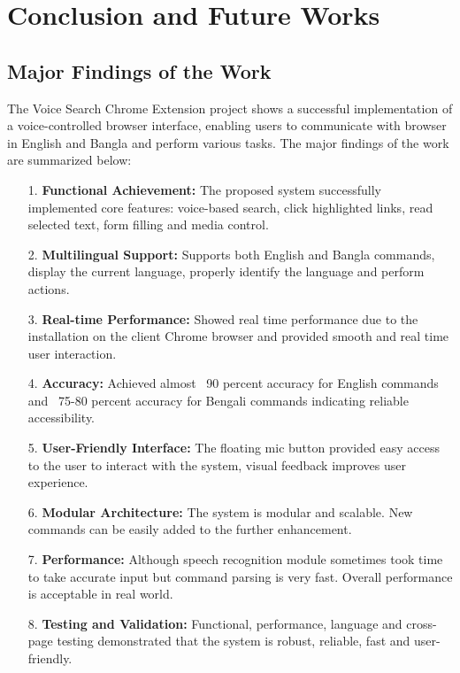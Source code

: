 
\chapter{Conclusion and Future Works}

\section{Major Findings of the Work}
The Voice Search Chrome Extension project shows a successful implementation of a voice-controlled browser interface, enabling users to communicate with browser in English and Bangla and perform various tasks. The major findings of the work are summarized below:
\begin{itemize}
\item[1.] 	\textbf{Functional Achievement:} The proposed system successfully implemented core features: voice-based search, click highlighted links, read selected text, form filling and media control.
\item[2.]	\textbf{Multilingual Support:} Supports both English and Bangla commands, display the current language, properly identify the language and perform actions.
\item[3.]	\textbf{Real-time Performance:} Showed real time performance due to the installation on the client Chrome browser and provided smooth and real time user interaction.
\item[4.]	\textbf{Accuracy:} Achieved almost ~90 percent accuracy for English commands and ~75-80 percent accuracy for Bengali commands indicating reliable accessibility.
\item[5.]	\textbf{User-Friendly Interface:} The floating mic button provided easy access to the user to interact with the system, visual feedback improves user experience.
\item[6.]	\textbf{Modular Architecture:} The system is modular and scalable.  New commands can be easily added to the further enhancement.
\item[7.]	\textbf{Performance:} Although speech recognition module sometimes took time to take accurate input but command parsing is very fast. Overall performance is acceptable in real world.
\item[8.]	\textbf{Testing and Validation:} Functional, performance, language and cross-page testing demonstrated that the system is robust, reliable, fast and user-friendly.
\end{itemize}

